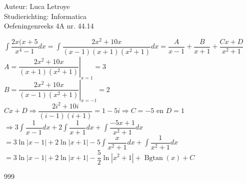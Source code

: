 \documentclass[a4paper]{article}
\newcommand{\dint}{\displaystyle\int}
\newcommand{\bgtan}{\operatorname{Bgtan}}
\begin{document}
  
\noindent \large Auteur: Luca Letroye \\
\noindent \large Studierichting: Informatica\\
\noindent \large Oefeningenreeks 4A nr. 44.14

\medskip
\normalsize

$\dint \dfrac{2x(x+5}{x^4-1}dx = \dint\dfrac{2x^2+10x}{(x-1)(x+1)(x^2+1)}dx = \dfrac{A}{x-1} + \dfrac{B}{x+1} + \dfrac{Cx+D}{x^2+1} $\\

$A  = \left. \dfrac{2x^2+10x}{(x+1)(x^2+1)}\right|_{x=1} = 3$\\

$B  = \left. \dfrac{2x^2+10x}{(x-1)(x^2+1)}\right|_{x=-1} = 2$\\

$Cx+D \Rightarrow \dfrac{2i^2+10i}{(i-1)(i+1)} = 1-5i \Rightarrow C = -5 $ en $ D = 1$\\

$\Rightarrow 3\dint \dfrac{1}{x-1}dx +2 \dint\dfrac{1}{x+1}dx + \dint \dfrac{-5x+1}{x^2+1}dx$\\

$ = 3\ln|x-1| +2\ln|x+1| - 5\dint\dfrac{x}{x^2+1}dx +\dint\dfrac{1}{x^2+1}dx$\\

$ = 3\ln|x-1| +2\ln|x+1| - \dfrac{5}{2}\ln|x^2+1|+\bgtan(x)+C$\\


\begin{thebibliography}{999}
\end{thebibliography}
\end{document}
